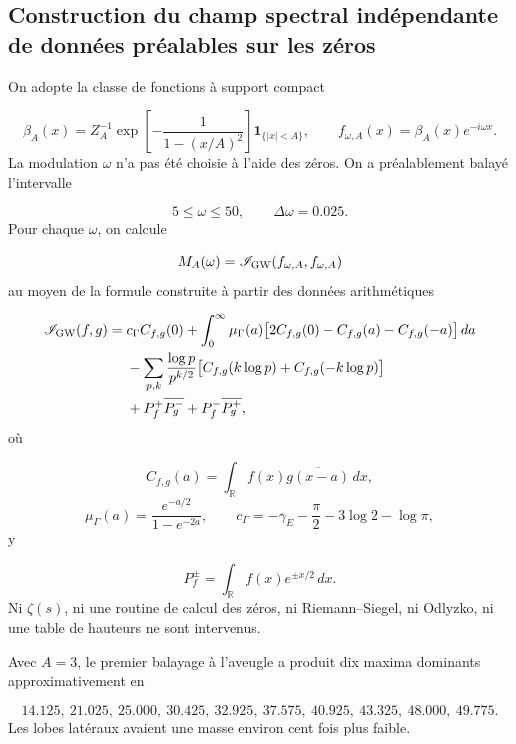 \subsection{Construction du champ spectral indépendante de données préalables sur les zéros}
On adopte la classe de fonctions à support compact\par
\[
\beta_A(x)=Z_A^{-1}
\exp\!\left[-\frac{1}{1-(x/A)^2}\right]
\mathbf 1_{\{|x|<A\}},
\qquad
f_{\omega,A}(x)=\beta_A(x)e^{-i\omega x}.
\]
La modulation \(\omega\) n'a pas été choisie à l'aide des zéros. On a préalablement balayé l'intervalle\par
\[
5\leq\omega\leq50,
\qquad
\Delta\omega=0.025.
\]
Pour chaque \(\omega\), on calcule\par
\[
M_A(\omega)
=
\mathscr I_{\rm GW}
(f_{\omega,A},f_{\omega,A})
\]
au moyen de la formule construite à partir des données arithmétiques\par
\[
\begin{aligned}
\mathscr I_{\rm GW}(f,g)
={}&c_\Gamma C_{f,g}(0)
+\int_0^\infty
\mu_\Gamma(a)
\bigl[
2C_{f,g}(0)-C_{f,g}(a)-C_{f,g}(-a)
\bigr]\,da\\
&-\sum_{p,k}
\frac{\log p}{p^{k/2}}
\bigl[
C_{f,g}(k\log p)+C_{f,g}(-k\log p)
\bigr]\\
&+P_f^+\overline{P_g^-}
+P_f^-\overline{P_g^+},
\end{aligned}
\]
où\par
\[
C_{f,g}(a)=\int_{\mathbb R}f(x)\overline{g(x-a)}\,dx,
\]
\[
\mu_\Gamma(a)=\frac{e^{-a/2}}{1-e^{-2a}},
\qquad
c_\Gamma=-\gamma_{\!E}-\frac{\pi}{2}-3\log2-\log\pi,
\]
y\par
\[
P_f^\pm=\int_{\mathbb R}f(x)e^{\pm x/2}\,dx.
\]
Ni \(\zeta(s)\), ni une routine de calcul des zéros, ni Riemann–Siegel, ni Odlyzko, ni une table de hauteurs ne sont intervenus.\par
Avec \(A=3\), le premier balayage à l'aveugle a produit dix maxima dominants approximativement en\par
\[
14.125,\ 21.025,\ 25.000,\ 30.425,\ 32.925,\ 37.575,\ 40.925,\ 43.325,\ 48.000,\ 49.775.
\]
Les lobes latéraux avaient une masse environ cent fois plus faible.\par
{}
